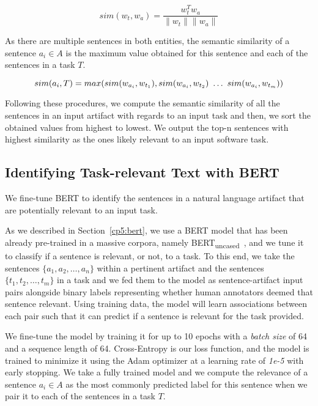 \begin{equation}
    sim(w_t,w_a) = \frac{w_t^Tw_a}{\|w_t\| \|w_a\|}
    \label{eq:word-sim}
\end{equation}
 
\smallskip
 As there are multiple sentences in both entities, the semantic similarity of a sentence $a_i \in A$ is the maximum value obtained for this sentence and each of the sentences in a task $T$.

 \begin{equation}
    sim(a_i, T) = max(sim(w_{a_i}, w_{t_1}), sim(w_{a_i}, w_{t_2}) ~\dots~ sim(w_{a_i}, w_{t_m})) \\
\end{equation}

\smallskip
Following these procedures, we compute the semantic similarity of all the sentences in an input artifact with regards to an input task and then, 
we sort the obtained values from highest to lowest. We output the top-n sentences with highest similarity as the ones likely relevant to an input software task.


\subsection{Identifying Task-relevant Text with BERT}
\label{cp5:approach-bert}



We fine-tune BERT to identify the sentences in a natural language artifact that are potentially relevant to an input task.



As we described in Section~\ref{cp5:bert}, we use a BERT model that has been already pre-trained in a massive corpora, namely BERT\textsubscript{uncased}~\cite{Devlin2018Bert}, and we tune it to classify if a sentence is relevant, or not, to a task.
To this end, we take the sentences $\{a_1, a_2, \dots, a_n\}$ within a pertinent artifact and the sentences $\{t_1, t_2, \dots, t_m\}$ in a task and we fed them to the model as sentence-artifact input pairs 
alongside binary labels representing whether human annotators deemed that sentence relevant. 
Using training data, the model will learn associations between each pair such that it can predict if a sentence is relevant for the task provided. 

We fine-tune the model by training it for up to 10 epochs with a \textit{batch size} of 64 and a sequence length of 64. Cross-Entropy is our loss function, and the model is trained to minimize it using the Adam optimizer at a learning rate of \textit{1e-5} with early stopping. 
We take a fully trained model and we compute the relevance of a sentence $a_i \in A$ as the most commonly predicted label for this sentence when we pair it to each of the sentences in a task $T$.


